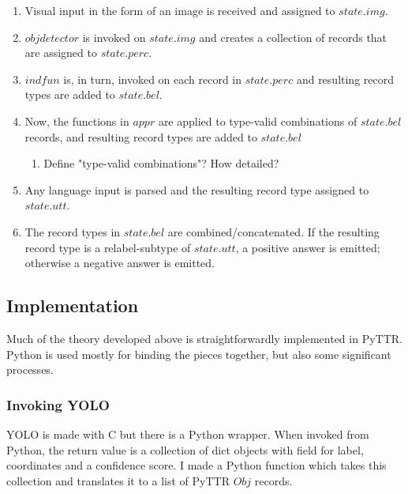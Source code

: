 \documentclass[11pt, a4paper]{article}
\begin{document}
\begin{enumerate}
\item Visual input in the form of an image is received and assigned to $state.img$.
\item $objdetector$ is invoked on $state.img$ and creates a collection of records that are assigned to $state.perc$.
\item $indfun$ is, in turn, invoked on each record in $state.perc$ and resulting record types are added to $state.bel$.
\item Now, the functions in $appr$ are applied to type-valid combinations of $state.bel$ records, and resulting record types are added to $state.bel$
	\begin{enumerate}
	\item Define "type-valid combinations"? How detailed?
	\end{enumerate}
\item Any language input is parsed and the resulting record type assigned to $state.utt$.
\item The record types in $state.bel$ are combined/concatenated. If the resulting record type is a relabel-subtype of $state.utt$, a positive answer is emitted; otherwise a negative answer is emitted.
\end{enumerate}



\subsection{Implementation}

Much of the theory developed above is straightforwardly implemented in PyTTR.
Python is used mostly for binding the pieces together, but also some significant processes.



\subsubsection{Invoking YOLO}

YOLO \citep{yolo} is made with C but there is a Python wrapper.
When invoked from Python, the return value is a collection of dict objects with field for label, coordinates and a confidence score.
I made a Python function which takes this collection and translates it to a list of PyTTR $Obj$ records.
\end{document}
